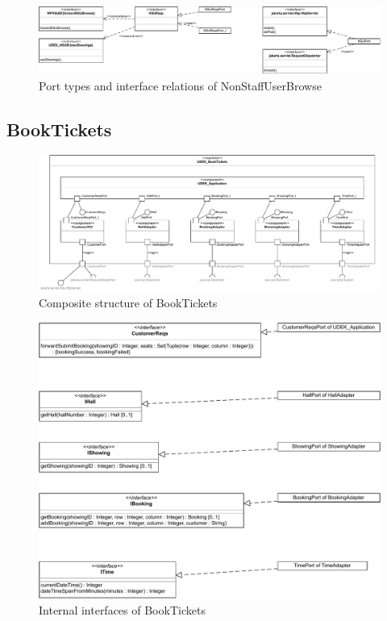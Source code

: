 \documentclass[a4paper,10pt,titlepage,bibtotoc,bibtotocnumbered]{scrreprt}
\begin{document}
\begin{figure}[H]
    \centering
    \includegraphics[width = \textwidth]{figures/08/A08_Browse-Port Types.drawio.pdf}
    \caption{Port types and interface relations of NonStaffUserBrowse}
    \label{figure:NonStaffUserBrowse_port_types}
\end{figure}

\subsection{BookTickets}

\begin{figure}[H]
\centering
\includegraphics[width = \textwidth]{figures/08/A08_BookTickets-Composite Structure.drawio.pdf}
\caption{Composite structure of BookTickets}
\label{figure:BookTickets_composite_structure}
\end{figure}

\begin{figure}[H]
\centering
\includegraphics[width = \textwidth]{figures/08/A08_BookTickets-Internal Interfaces.drawio.pdf}
\caption{Internal interfaces of BookTickets}
\label{figure:BookTickets_internal_interfaces}
\end{figure}
\end{document}
